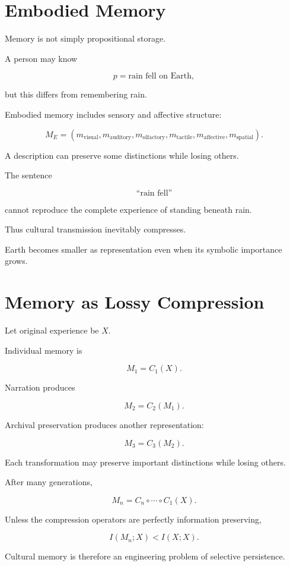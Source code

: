 \documentclass[11pt,oneside]{book}
\theoremstyle{definition}
\theoremstyle{remark}
\begin{document}
\section{Embodied Memory}

Memory is not simply propositional storage.

A person may know

\[
p=\text{rain fell on Earth},
\]

but this differs from remembering rain.

Embodied memory includes sensory and affective structure:

\[
M_E
=
(
m_{\mathrm{visual}},
m_{\mathrm{auditory}},
m_{\mathrm{olfactory}},
m_{\mathrm{tactile}},
m_{\mathrm{affective}},
m_{\mathrm{spatial}}
).
\]

A description can preserve some distinctions while losing others.

The sentence

\[
\text{``rain fell''}
\]

cannot reproduce the complete experience of standing beneath rain.

Thus cultural transmission inevitably compresses.

Earth becomes smaller as representation even when its symbolic importance grows.

\section{Memory as Lossy Compression}

Let original experience be \(X\).

Individual memory is

\[
M_1=C_1(X).
\]

Narration produces

\[
M_2=C_2(M_1).
\]

Archival preservation produces another representation:

\[
M_3=C_3(M_2).
\]

Each transformation may preserve important distinctions while losing others.

After many generations,

\[
M_n
=
C_n\circ\cdots\circ C_1(X).
\]

Unless the compression operators are perfectly information preserving,

\[
I(M_n;X)
<
I(X;X).
\]

Cultural memory is therefore an engineering problem of selective persistence.
\end{document}
